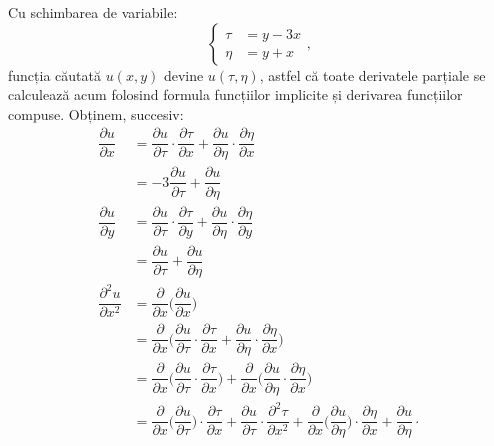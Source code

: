 Cu schimbarea de variabile:
\[
  \begin{cases}
    \tau &= y - 3x \\
    \eta &= y + x
  \end{cases},
\]
funcția căutată $ u(x, y) $ devine $ u(\tau, \eta) $, astfel că toate derivatele parțiale
se calculează acum folosind formula funcțiilor implicite și derivarea funcțiilor compuse. Obținem, succesiv:
\begin{align*}
  \dfrac{\partial u}{\partial x} &= \dfrac{\partial u}{\partial \tau} \cdot \dfrac{\partial \tau}{\partial x} + %
                                   \dfrac{\partial u}{\partial \eta} \cdot \dfrac{\partial \eta}{\partial x} \\
                                 &=- 3\dfrac{\partial u}{\partial \tau} + \dfrac{\partial u}{\partial \eta} \\
  \dfrac{\partial u}{\partial y} &= \dfrac{\partial u}{\partial \tau} \cdot \dfrac{\partial \tau}{\partial y} + %
                                   \dfrac{\partial u}{\partial \eta} \cdot \dfrac{\partial \eta}{\partial y} \\
                                 &=\dfrac{\partial u}{\partial \tau} + \dfrac{\partial u}{\partial \eta} \\
  \dfrac{\partial^2 u}{\partial x^2} &= \dfrac{\partial}{\partial x} \Big( \dfrac{\partial u}{\partial x} \Big)  \\
                                 &= \dfrac{\partial}{\partial x} \Big( \dfrac{\partial u}{\partial \tau} \cdot %
                                   \dfrac{\partial \tau}{\partial x} + \dfrac{\partial u}{\partial \eta} \cdot \dfrac{\partial \eta}{\partial x} \Big) \\
                                 &= \dfrac{\partial}{\partial x} \Big( \dfrac{\partial u}{\partial \tau} \cdot \dfrac{\partial \tau}{\partial x}\Big) + %
                                   \dfrac{\partial}{\partial x} \Big( \dfrac{\partial u}{\partial \eta} \cdot \dfrac{\partial \eta}{\partial x} \Big) \\
                                 &= \dfrac{\partial}{\partial x} \Big( \dfrac{\partial u}{\partial \tau} \Big) \cdot %
                                   \dfrac{\partial \tau}{\partial x} + \dfrac{\partial u}{\partial \tau} \cdot %
                                   \dfrac{\partial^2 \tau}{\partial x^2} + \dfrac{\partial}{\partial x} \Big( \dfrac{\partial u}{\partial \eta} \Big) \cdot %
                                   \dfrac{\partial \eta}{\partial x} + \dfrac{\partial u}{\partial \eta} \cdot

\end{align*}
